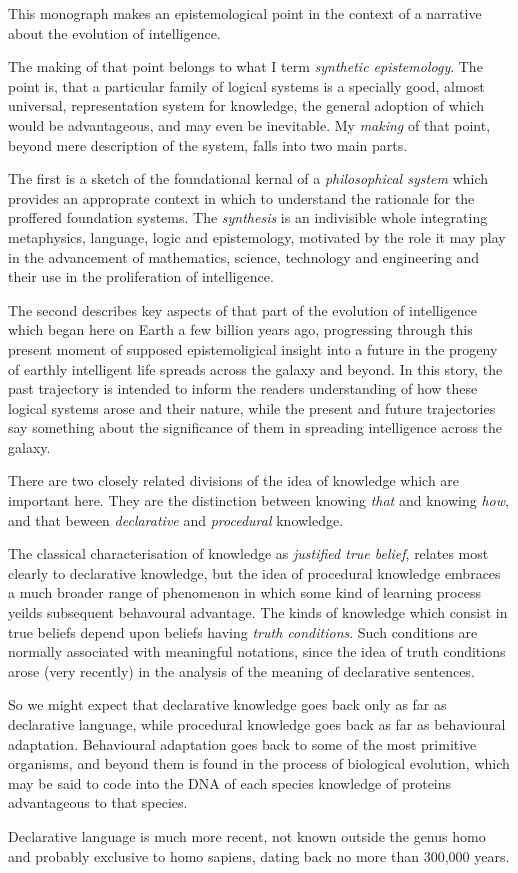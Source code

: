 
This monograph makes an epistemological point in the context of a narrative about the evolution of intelligence.

The making of that point belongs to what I term \emph{synthetic epistemology}.
The point is, that a particular family of logical systems is a specially good, almost universal, representation system for knowledge, the general adoption of which would be advantageous, and may even be inevitable.
My \emph{making} of that point, beyond mere description of the system, falls into two main parts.

The first is a sketch of the foundational kernal of a \emph{philosophical system} which provides an approprate context in which to understand the rationale for the proffered foundation systems.
The \emph{synthesis} is an indivisible whole integrating metaphysics, language, logic and epistemology, motivated by the role it may play in the advancement of mathematics, science, technology and engineering and their use in the proliferation of intelligence. 

The second describes key aspects of that part of the evolution of intelligence which began here on Earth a few billion years ago, progressing through this present moment of supposed epistemoligical insight into a future in the progeny of earthly intelligent life spreads across the galaxy and beyond.
In this story, the past trajectory is intended to inform the readers understanding of how these logical systems arose and their nature, while the present and future trajectories say something about the significance of them in spreading intelligence across the galaxy.

There are two closely related divisions of the idea of knowledge which are important here.
They are the distinction between knowing \emph{that} and knowing \emph{how}, and that beween \emph{declarative} and \emph{procedural} knowledge.

The classical characterisation of knowledge as \emph{justified true belief}, relates most clearly to declarative knowledge, but the idea of procedural knowledge embraces a much broader range of phenomenon in which some kind of learning process yeilds subsequent behavoural advantage.
The kinds of knowledge which consist in true beliefs depend upon beliefs having \emph{truth conditions}.
Such conditions are normally associated with meaningful notations, since the idea of truth conditions arose (very recently) in the analysis of the meaning of declarative sentences.

So we might expect that declarative knowledge goes back only as far as declarative language, while procedural knowledge goes back as far as behavioural adaptation.
Behavioural adaptation goes back to some of the most primitive organisms, and beyond them is found in the process of biological evolution, which may be said to code into the DNA of each species knowledge of proteins advantageous to that species.

Declarative language is much more recent, not known outside the genus homo and probably exclusive to homo sapiens, dating back no more than 300,000 years.






